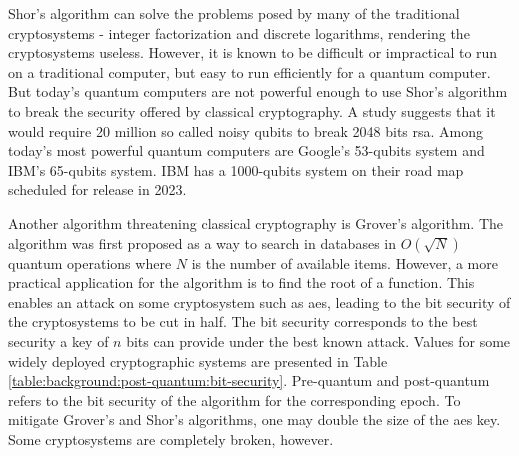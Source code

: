 Shor's algorithm can solve the problems posed by many of the traditional cryptosystems - integer factorization and discrete logarithms, rendering the cryptosystems useless\cite{shor1997}. However, it is known to be difficult or impractical to run on a traditional computer, but easy to run efficiently for a quantum computer. But today's quantum computers are not powerful enough to use Shor's algorithm to break the security offered by classical cryptography\cite{bernstein2017}. A study \cite{gidney2019} suggests that it would require 20 million so called noisy \glspl{qubit} to break 2048 bits \gls{rsa}. Among today's most powerful quantum computers are Google's 53-\glspl{qubit} system\cite{google2019:quantum-computer} and IBM's 65-\glspl{qubit} system\cite{ibm2020:quantum-computer}. IBM has a 1000-\glspl{qubit} system on their road map scheduled for release in 2023\cite{ibm2020:quantum-computer}.

Another algorithm threatening classical cryptography is Grover's algorithm. The algorithm was first proposed as a way to search in databases in $O(\sqrt N)$ quantum operations where $N$ is the number of available items\cite{grover1996}. However, a more practical application for the algorithm is to find the root of a function\cite{bernstein2017}. This enables an attack on some cryptosystem such as \gls{aes}, leading to the bit security of the cryptosystems to be cut in half. The bit security corresponds to the best security a key of $n$ bits can provide under the best known attack. Values for some widely deployed cryptographic systems are presented in Table \ref{table:background:post-quantum:bit-security}. Pre-quantum and post-quantum refers to the bit security of the algorithm for the corresponding epoch. To mitigate Grover's and Shor's algorithms, one may double the size of the \gls{aes} key. Some cryptosystems are completely broken, however.

